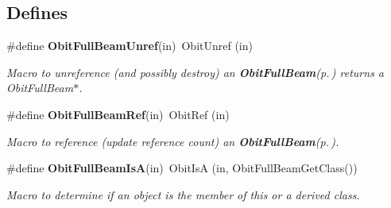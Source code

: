 \subsection*{Defines}
\begin{CompactItemize}
\item 
\#define {\bf Obit\-Full\-Beam\-Unref}(in)\ Obit\-Unref (in)
\begin{CompactList}\small\item\em Macro to unreference (and possibly destroy) an {\bf Obit\-Full\-Beam}{\rm (p.\,\pageref{structObitFullBeam})} returns a Obit\-Full\-Beam$\ast$. \item\end{CompactList}\item 
\#define {\bf Obit\-Full\-Beam\-Ref}(in)\ Obit\-Ref (in)
\begin{CompactList}\small\item\em Macro to reference (update reference count) an {\bf Obit\-Full\-Beam}{\rm (p.\,\pageref{structObitFullBeam})}. \item\end{CompactList}\item 
\#define {\bf Obit\-Full\-Beam\-Is\-A}(in)\ Obit\-Is\-A (in, Obit\-Full\-Beam\-Get\-Class())
\begin{CompactList}\small\item\em Macro to determine if an object is the member of this or a derived class. \item\end{CompactList}\end{CompactItemize}
